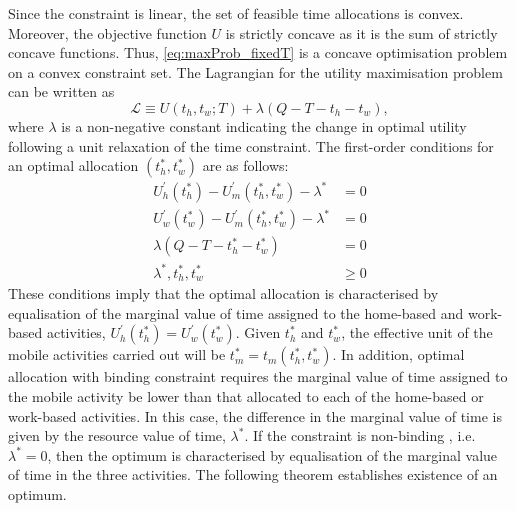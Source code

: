 \documentclass[12pt,a4paper,british]{article}
\begin{document}
Since the constraint is linear, the set of feasible time allocations is convex. Moreover, the objective function $U$ is strictly concave as it is the sum of strictly concave functions. Thus, \eqref{eq:maxProb_fixedT} is a concave optimisation problem on a convex constraint set. The Lagrangian for the utility maximisation problem can be written as
\begin{equation*}
\mathcal{L} \equiv U\left(t_{h},t_{w};T\right) + \lambda \left(Q - T - t_{h} - t_{w}\right),
\end{equation*}%
where $\lambda$ is a non-negative constant indicating the change in optimal utility following a unit relaxation of the time constraint. The first-order conditions for an optimal allocation $\left(t_h^{\ast}, t_w^{\ast}\right)$ are as follows:
\begin{subequations}
\begin{align}
U_{h}^{\prime}\left(t_{h}^{\ast}\right)-U_{m}^{\prime}\left(t_{h}^{\ast}, t_{w}^{\ast}\right)-\lambda^{\ast} & =0
\label{eq:foc_deterministic_th} \\
U_{w}^{\prime}\left(t_{w}^{\ast}\right)-U_{m}^{\prime}\left(t_{h}^{\ast}, t_{w}^{\ast}\right)-\lambda^{\ast} & = 0
\label{eq:foc_deterministic_tw} \\
\lambda\left(Q - T - t_{h}^{\ast} - t_{w}^{\ast}\right) & =0
\label{eq:foc_deterministic_lmd} \\
\lambda^{\ast},t_{h}^{\ast},t_{w}^{\ast} & \geq 0
\label{eq:foc_deterministic_nonnega}
\end{align}\label{eq:foc_deterministic}
\end{subequations}
These conditions imply that the optimal allocation is characterised by equalisation of the marginal value of time assigned to the home-based and work-based activities, $U_{h}^{\prime}\left( t_{h}^{\ast} \right) = U_{w}^{\prime}\left( t_{w}^{\ast}\right)$. Given $t_{h}^{\ast}$ and $t_{w}^{\ast}$, the effective unit of the mobile activities carried out will be $t_{m}^{\ast} = t_{m}\left( t_{h}^{\ast},t_{w}^{\ast} \right)$. In addition, optimal allocation with binding constraint requires the marginal value of time assigned to the mobile activity be lower than that allocated to each of the home-based or work-based activities. In this case, the difference in the marginal value of time is given by the resource value of time, $\lambda^{\ast}$. If the constraint is non-binding , i.e. $\lambda^{\ast}=0$, then the optimum is characterised by equalisation of the marginal value of time in the three activities. The following theorem establishes existence of an optimum.
\end{document}
